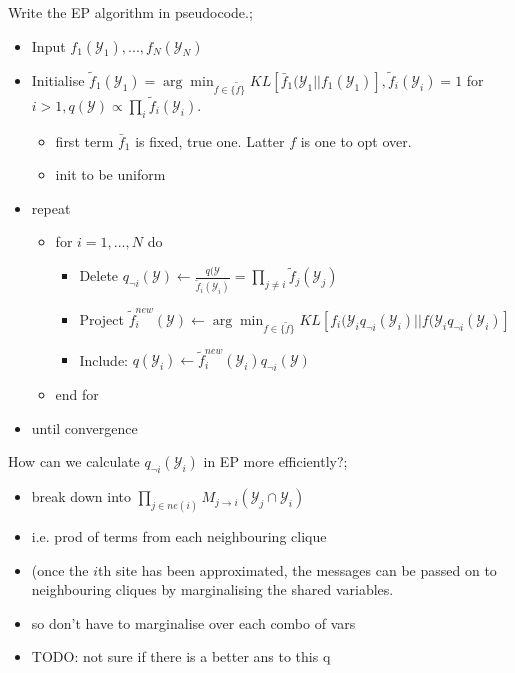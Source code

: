 \documentclass{article}
\begin{document}
Write the EP algorithm in pseudocode.; \begin{itemize} \item Input $f_1(\mathcal{Y}_1), ..., f_N(\mathcal{Y}_N)$ \item Initialise $\tilde{f}_1(\mathcal{Y}_1)=\arg\min_{f\in\{\tilde{f}\}} KL[\bar{f}_1(\mathcal{Y}_1||f_1(\mathcal{Y}_1)], \tilde{f}_i(\mathcal{Y}_i)=1$ for $i>1, q(\mathcal{Y})\propto\prod_i\tilde{f}_i(\mathcal{Y}_i)$. \begin{itemize} \item first term $\bar{f}_1$ is fixed, true one. Latter $f$ is one to opt over. \item init to be uniform \end{itemize} \item repeat \begin{itemize} \item for $i=1,...,N$ do \begin{itemize} \item Delete $q_{\neg i}(\mathcal{Y})\leftarrow \frac{q(\mathcal{Y}}{\tilde{f}_i(\mathcal{Y}_i)}=\prod_{j\ne i}\tilde{f}_j(\mathcal{Y}_j)$ \item Project $\tilde{f}_i^{new}(\mathcal{Y})\leftarrow \arg\min_{f\in \{\tilde{f}\}} KL[f_i(\mathcal{Y}_iq_{\neg i}(\mathcal{Y}_i)||f(\mathcal{Y}_iq_{\neg i}(\mathcal{Y}_i)]$ \item Include: $q(\mathcal{Y}_i)\leftarrow \tilde{f}_i^{new}(\mathcal{Y}_i)q_{\neg i}(\mathcal{Y})$ \end{itemize} \item end for \end{itemize} \item until convergence \end{itemize}

How can we calculate $q_{\neg i}(\mathcal{Y}_i)$ in EP more efficiently?; \begin{itemize} \item break down into $\prod_{j\in ne(i)}M_{j\rightarrow i}(\mathcal{Y}_j \cap \mathcal{Y}_i)$ \item i.e. prod of terms from each neighbouring clique \item (once the $i$th site has been approximated, the messages can be passed on to neighbouring cliques by marginalising the shared variables. \item so don't have to marginalise over each combo of vars \item TODO: not sure if there is a better ans to this q \end{itemize}
\end{document}
